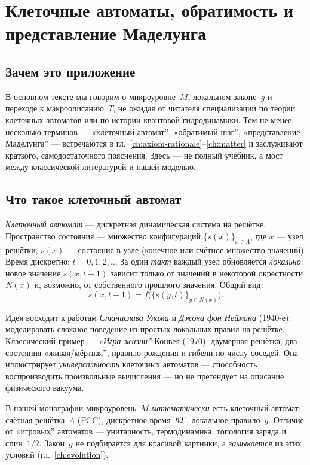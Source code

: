\chapter{Клеточные автоматы, обратимость и представление Маделунга}
\label{app:background}

\section{Зачем это приложение}

В основном тексте мы говорим о микроуровне~$M$, локальном законе~$g$ и переходе к макроописанию~$T$,
не ожидая от читателя специализации по теории клеточных автоматов или по истории квантовой гидродинамики.
Тем не менее несколько терминов --- «клеточный автомат'', «обратимый шаг'', «представление Маделунга'' ---
встречаются в гл.~\ref{ch:axiom-rationale}--\ref{ch:matter} и заслуживают краткого,
самодостаточного пояснения.
Здесь --- не полный учебник, а мост между классической литературой и нашей моделью.

\section{Что такое клеточный автомат}

\emph{Клеточный автомат} --- дискретная динамическая система на решётке.
Пространство состояния --- множество конфигураций $\{s(x)\}_{x\in\Lambda}$,
где $x$ --- узел решётки, $s(x)$ --- состояние в узле (конечное или счётное множество значений).
Время дискретно: $t=0,1,2,\ldots$
За один \emph{такт} каждый узел обновляется \emph{локально}:
новое значение $s(x,t+1)$ зависит только от значений в некоторой окрестности $N(x)$ и,
возможно, от собственного прошлого значения.
Общий вид:
\[
s(x,t+1)=f\bigl(\{s(y,t)\}_{y\in N(x)}\bigr).
\]

Идея восходит к работам \emph{Станислава Улама} и \emph{Джона фон Неймана} (1940-е):
моделировать сложное поведение из простых локальных правил на решётке.
Классический пример --- \emph{«Игра жизни''} Конвея (1970): двумерная решётка,
два состояния «живая/мёртвая'', правило рождения и гибели по числу соседей.
Она иллюстрирует \emph{универсальность} клеточных автоматов --- способность воспроизводить
произвольные вычисления --- но не претендует на описание физического вакуума.

В нашей монографии микроуровень~$M$ \emph{математически} есть клеточный автомат:
счётная решётка~$\Lambda$ (FCC), дискретное время~$hT$, локальное правило~$g$.
Отличие от «игровых'' автоматов --- унитарность, термодинамика, топология заряда и спин~$1/2$.
Закон~$g$ не подбирается для красивой картинки, а \emph{замыкается} из этих условий
(гл.~\ref{ch:evolution}).

